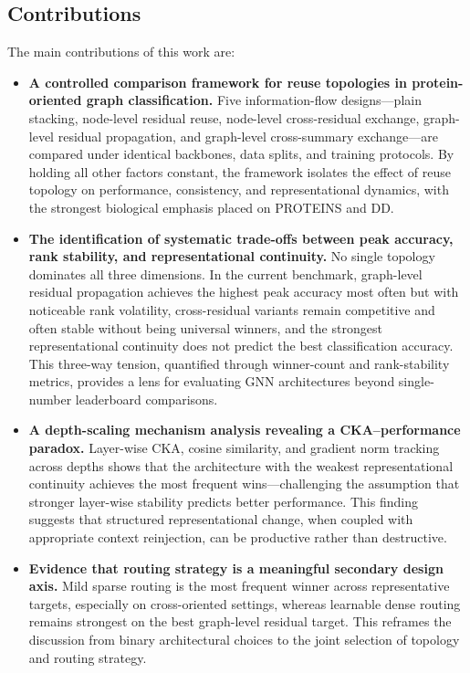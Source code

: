 \subsection{Contributions}

The main contributions of this work are:

\begin{itemize}
    \item \textbf{A controlled comparison framework for reuse topologies in protein-oriented graph classification.} Five information-flow designs---plain stacking, node-level residual reuse, node-level cross-residual exchange, graph-level residual propagation, and graph-level cross-summary exchange---are compared under identical backbones, data splits, and training protocols. By holding all other factors constant, the framework isolates the effect of reuse topology on performance, consistency, and representational dynamics, with the strongest biological emphasis placed on PROTEINS and DD.

    \item \textbf{The identification of systematic trade-offs between peak accuracy, rank stability, and representational continuity.} No single topology dominates all three dimensions. In the current benchmark, graph-level residual propagation achieves the highest peak accuracy most often but with noticeable rank volatility, cross-residual variants remain competitive and often stable without being universal winners, and the strongest representational continuity does not predict the best classification accuracy. This three-way tension, quantified through winner-count and rank-stability metrics, provides a lens for evaluating GNN architectures beyond single-number leaderboard comparisons.

    \item \textbf{A depth-scaling mechanism analysis revealing a CKA--performance paradox.} Layer-wise CKA, cosine similarity, and gradient norm tracking across depths shows that the architecture with the weakest representational continuity achieves the most frequent wins---challenging the assumption that stronger layer-wise stability predicts better performance. This finding suggests that structured representational change, when coupled with appropriate context reinjection, can be productive rather than destructive.

    \item \textbf{Evidence that routing strategy is a meaningful secondary design axis.} Mild sparse routing is the most frequent winner across representative targets, especially on cross-oriented settings, whereas learnable dense routing remains strongest on the best graph-level residual target. This reframes the discussion from binary architectural choices to the joint selection of topology and routing strategy.
\end{itemize}
